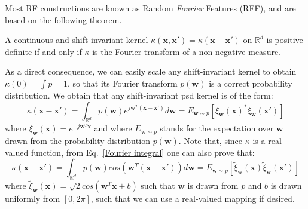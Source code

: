 Most RF constructions are known as Random \emph{Fourier} Features (RFF), and are based on the following theorem.
\begin{theorem}
A continuous and shift-invariant kernel $\kappa(\mathbf{x},\mathbf{x}')=\kappa(\mathbf{x}-\mathbf{x}')$ on $\mathbb{R}^d$ is positive definite if and only if $\kappa$ is the Fourier transform of a non-negative measure.
\end{theorem}
As a direct consequence, we can easily scale any shift-invariant kernel to obtain $\kappa(0) = \int p = 1$, so that its Fourier transform $p(\mathbf{w})$ is a correct probability distribution. We obtain that any shift-invariant psd kernel is of the form:
\begin{equation}
\label{Fourier integral}
\kappa(\mathbf{x}-\mathbf{x}')=\int_{\mathbb{R}^d}p(\mathbf{w})e^{j\mathbf{w}^T(\mathbf{x}-\mathbf{x}')}d\mathbf{w}= E_{\mathbf{w}\sim p}[\xi_\mathbf{w}(\mathbf{x})^*\xi_\mathbf{w}(\mathbf{x}')]
\end{equation}
where $\xi_\mathbf{w}(\mathbf{x})=e^{-j\mathbf{w}^T\mathbf{x}}$ and where $E_{\mathbf{w}\sim p}$ stands for the expectation over $\mathbf{w}$ drawn from the probability distribution $p(\mathbf{w})$. Note that, since $\kappa$ is a real-valued function, from Eq.~\ref{Fourier integral} one can also prove that:
\begin{equation}
\label{real Fourier integral}
\kappa(\mathbf{x}-\mathbf{x}')=\int_{\mathbb{R}^d}p(\mathbf{w})cos({\mathbf{w}^T(\mathbf{x}-\mathbf{x}')})d\mathbf{w}=E_{\mathbf{w}\sim p}[\tilde \xi_\mathbf{w}(\mathbf{x})\tilde \xi_\mathbf{w}(\mathbf{x}')]
\end{equation}
where $\tilde \xi_\mathbf{w}(\mathbf{x})=\sqrt{2}cos(\mathbf{w}^T\mathbf{x}+b)$ such that $\mathbf{w}$ is drawn from $p$ and $b$ is drawn uniformly from $[0,2\pi]$, such that we can use a real-valued mapping if desired.

